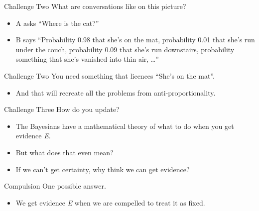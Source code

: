 \documentclass[
  17pt,
  letterpaper,
  ignorenonframetext,
  aspectratio=169,
]{beamer}
\providecommand{\tightlist}{%
  \setlength{\itemsep}{0pt}\setlength{\parskip}{0pt}}\usepackage{longtable,booktabs,array}
\begin{document}
\begin{frame}{Challenge Two}
\protect\hypertarget{challenge-two}{}
What are conversations like on this picture?

\begin{itemize}[<+->]
\tightlist
\item
  A asks ``Where is the cat?''
\item
  B says ``Probability 0.98 that she's on the mat, probability 0.01 that
  she's run under the couch, probability 0.09 that she's run downstairs,
  probability something that she's vanished into thin air, \ldots{}''
\end{itemize}
\end{frame}

\begin{frame}{Challenge Two}
\protect\hypertarget{challenge-two-1}{}
You need something that licences ``She's on the mat''.

\begin{itemize}[<+->]
\tightlist
\item
  And that will recreate all the problems from anti-proportionality.
\end{itemize}
\end{frame}

\begin{frame}{Challenge Three}
\protect\hypertarget{challenge-three}{}
How do you update?

\begin{itemize}[<+->]
\tightlist
\item
  The Bayesians have a mathematical theory of what to do when you get
  evidence \emph{E}.
\item
  But what does that even mean?
\item
  If we can't get certainty, why think we can get evidence?
\end{itemize}
\end{frame}

\begin{frame}{Compulsion}
\protect\hypertarget{compulsion-5}{}
One possible answer.

\begin{itemize}[<+->]
\tightlist
\item
  We get evidence \emph{E} when we are compelled to treat it as fixed.
\end{itemize}
\end{frame}
\end{document}
